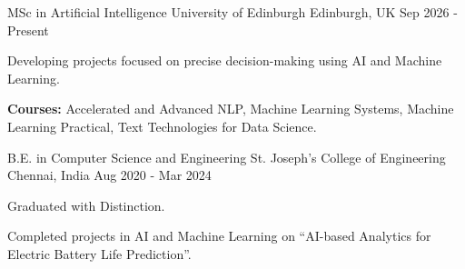 

\begin{cventries}

  \cventry
    {MSc in Artificial Intelligence} %
    {University of Edinburgh} %
    {Edinburgh, UK} %
    {Sep 2026 - Present} %
    {
      \begin{cvitems} %
        \item {Developing projects focused on precise decision-making using AI and Machine Learning.}
        \item {\textbf{Courses:} Accelerated and Advanced NLP, Machine Learning Systems, Machine Learning Practical, Text Technologies for Data Science.}
      \end{cvitems}
    }
  \vspace{6mm}
  \cventry
    {B.E. in Computer Science and Engineering} %
    {St. Joseph's College of Engineering} %
    {Chennai, India} %
    {Aug 2020 - Mar 2024} %
    {
      \begin{cvitems} %
        \item {Graduated with Distinction.}
        \item {Completed projects in AI and Machine Learning on ``AI-based Analytics for Electric Battery Life Prediction''.}
      \end{cvitems}
    }

\end{cventries}
